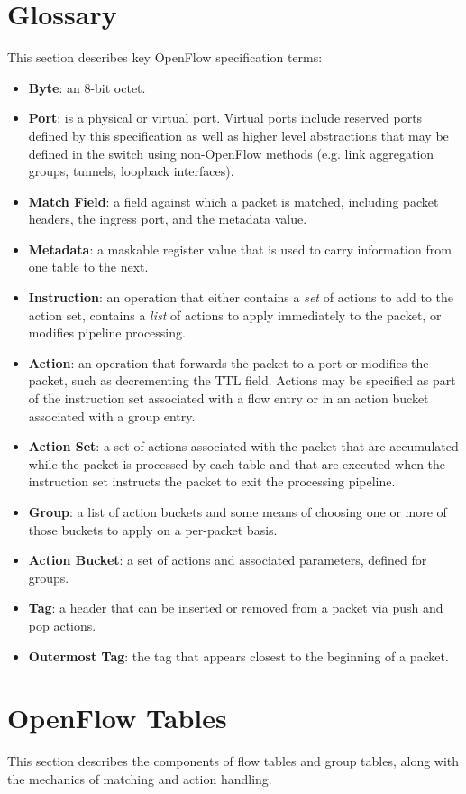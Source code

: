 \documentclass[10pt]{article}
\begin{document}
\section{Glossary}
This section describes key OpenFlow specification terms:
\begin{itemize}
\item \textbf{Byte}: an 8-bit octet.
\item \textbf{Port}: is a physical or virtual port. Virtual ports include reserved ports defined by this specification as well as higher level abstractions that may be defined in the switch using non-OpenFlow methods (e.g. link aggregation groups, tunnels, loopback interfaces).
\item \textbf{Match Field}: a field against which a packet is matched, including packet headers, the ingress port, and the metadata value.
\item \textbf{Metadata}: a maskable register value that is used to carry information from one table to the next.
\item \textbf{Instruction}: an operation that either contains a \emph{set} of actions to add to the action set, contains a \emph{list} of actions to apply immediately to the packet, or modifies pipeline processing.
\item \textbf{Action}: an operation that forwards the packet to a port or modifies the packet, such as decrementing the TTL field. Actions may be specified as part of the instruction set associated with a flow entry or in an action bucket associated with a group entry.
\item \textbf{Action Set}: a set of actions associated with the packet that are accumulated while the packet is processed by each table and that are executed when the instruction set instructs the packet to exit the processing pipeline.
\item \textbf{Group}: a list of action buckets and some means of choosing one or more of those buckets to apply on a per-packet basis.
\item \textbf{Action Bucket}: a set of actions and associated parameters, defined for groups.
\item \textbf{Tag}: a header that can be inserted or removed from a packet via push and pop actions.
\item \textbf{Outermost Tag}: the tag that appears closest to the beginning of a packet.
\end{itemize}

\section{OpenFlow Tables}
This section describes the components of flow tables and group tables, along with the mechanics of matching and action handling.
\end{document}

